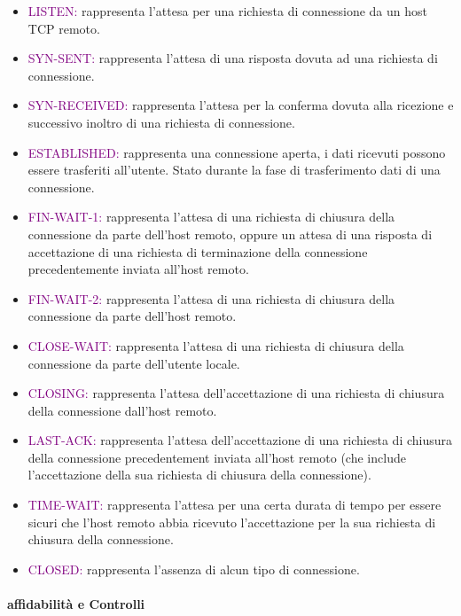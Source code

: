 \begin{itemize}
    \item \textcolor{purple}{LISTEN:} rappresenta l'attesa per una richiesta di connessione da un host TCP remoto.
    \item \textcolor{purple}{SYN-SENT:} rappresenta l'attesa di una risposta dovuta ad una richiesta di connessione.
    \item \textcolor{purple}{SYN-RECEIVED:} rappresenta l'attesa per la conferma dovuta alla ricezione e successivo inoltro di una richiesta di connessione.
    \item \textcolor{purple}{ESTABLISHED:} rappresenta una connessione aperta, i dati ricevuti possono essere trasferiti all'utente. Stato durante la fase di trasferimento dati di una connessione.
    \item \textcolor{purple}{FIN-WAIT-1:} rappresenta l'attesa di una richiesta di chiusura della connessione da parte dell'host remoto, oppure un attesa di una risposta di accettazione di una richiesta di terminazione della connessione precedentemente inviata all'host remoto.
    \item \textcolor{purple}{FIN-WAIT-2:} rappresenta l'attesa di una richiesta di chiusura della connessione da parte dell'host remoto.
    \item \textcolor{purple}{CLOSE-WAIT:} rappresenta l'attesa di una richiesta di chiusura della connessione da parte dell'utente locale.
    \item \textcolor{purple}{CLOSING:} rappresenta l'attesa dell'accettazione di una richiesta di chiusura della connessione dall'host remoto.
    \item \textcolor{purple}{LAST-ACK:} rappresenta l'attesa dell'accettazione di una richiesta di chiusura della connessione precedentement inviata all'host remoto (che include l'accettazione della sua richiesta di chiusura della connessione).
    \item \textcolor{purple}{TIME-WAIT:} rappresenta l'attesa per una certa durata di tempo per essere sicuri che l'host remoto abbia ricevuto l'accettazione per la sua richiesta di chiusura della connessione.
    \item \textcolor{purple}{CLOSED:} rappresenta l'assenza di alcun tipo di connessione.
\end{itemize}

\paragraph{affidabilità e Controlli}
